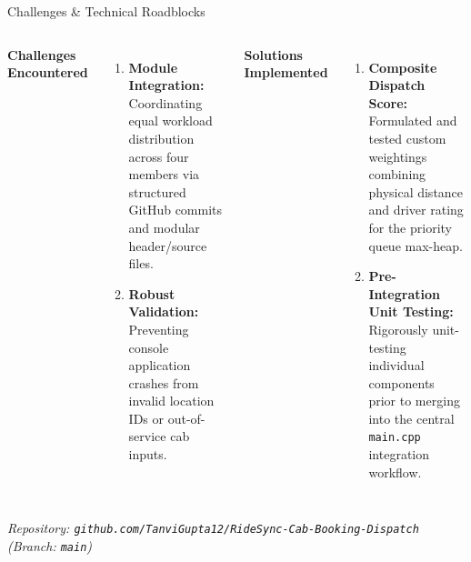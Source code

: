 \documentclass[aspectratio=169,11pt]{beamer}
\begin{document}
\begin{frame}{Challenges \& Technical Roadblocks}

\footnotesize
\vspace{-2mm}

\begin{columns}[T,totalwidth=\textwidth]

\textbf{\color{GEUBlue}Challenges Encountered}
\begin{enumerate}\itemsep1pt
\item \textbf{Module Integration:} Coordinating equal workload distribution across four members via structured GitHub commits and modular header/source files.
\item \textbf{Robust Validation:} Preventing console application crashes from invalid location IDs or out-of-service cab inputs.
\end{enumerate}

\textbf{\color{GEUBlue}Solutions Implemented}
\begin{enumerate}\itemsep1pt
\item \textbf{Composite Dispatch Score:} Formulated and tested custom weightings combining physical distance and driver rating for the priority queue max-heap.
\item \textbf{Pre-Integration Unit Testing:} Rigorously unit-testing individual components prior to merging into the central \texttt{main.cpp} integration workflow.
\end{enumerate}

\end{columns}

\vspace{2mm}
\begin{center}
\tiny
\textit{Repository: \texttt{github.com/TanviGupta12/RideSync-Cab-Booking-Dispatch} (Branch: \texttt{main})}
\end{center}

\end{frame}
\end{document}
